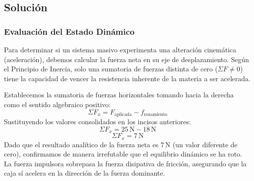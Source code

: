 \documentclass[12pt]{article}
\begin{document}
\begin{center}
\end{center}

\subsection*{Solución}

\subsubsection*{Evaluación del Estado Dinámico}
Para determinar si un sistema masivo experimenta una alteración cinemática (aceleración), debemos calcular la fuerza neta en su eje de desplazamiento. Según el Principio de Inercia, solo una sumatoria de fuerzas distinta de cero ($\Sigma F \neq 0$) tiene la capacidad de vencer la resistencia inherente de la materia a ser acelerada.

Establecemos la sumatoria de fuerzas horizontales tomando hacia la derecha como el sentido algebraico positivo:
\begin{equation}
    \Sigma F_x = F_{\text{aplicada}} - f_{\text{rozamiento}}
\end{equation}
Sustituyendo los valores consolidados en los incisos anteriores:
\begin{equation}
    \Sigma F_x = 25 \, \text{N} - 18 \, \text{N}
\end{equation}
\begin{equation}
    \Sigma F_x = 7 \, \text{N}
\end{equation}
Dado que el resultado analítico de la fuerza neta es $7 \, \text{N}$ (un valor diferente de cero), confirmamos de manera irrefutable que el equilibrio dinámico se ha roto. La fuerza impulsora sobrepasa la fuerza disipativa de fricción, asegurando que la caja sí acelera en la dirección de la fuerza dominante.
\end{document}
